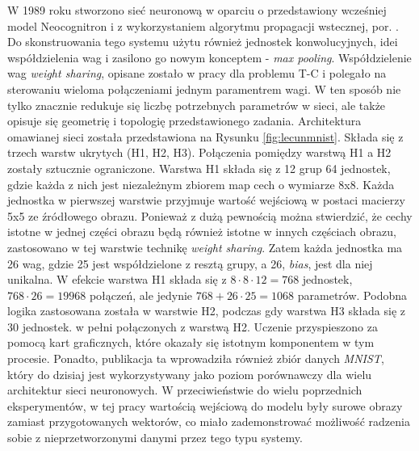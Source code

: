 \documentclass[12pt,a4paper,twoside]{article}
\begin{document}
W 1989 roku stworzono sieć neuronową w oparciu o przedstawiony wcześniej model Neocognitron \citet{fukushima1980} i z wykorzystaniem algorytmu propagacji wstecznej, por. \citet{lecun1989b}. Do skonstruowania tego systemu użytu również jednostek konwolucyjnych, idei współdzielenia wag i zasilono go nowym konceptem - \textit{max pooling}. Współdzielenie wag \textit{weight sharing}, opisane zostało w pracy \citet{rumelhart1986} dla problemu T-C i polegało na sterowaniu wieloma połączeniami jednym paramentrem wagi. W ten sposób nie tylko znacznie redukuje się liczbę potrzebnych parametrów w sieci, ale także opisuje się geometrię i topologię przedstawionego zadania. Architektura omawianej sieci została przedstawiona na Rysunku \ref{fig:lecunmnist}. Składa się z trzech warstw ukrytych (H1, H2, H3). Połączenia pomiędzy warstwą H1 a H2 zostały sztucznie ograniczone. Warstwa H1 składa się z 12 grup 64 jednostek, gdzie każda z nich jest niezależnym zbiorem map cech o wymiarze 8x8. Każda jednostka w pierwszej warstwie przyjmuje wartość wejściową w postaci macierzy 5x5 ze źródłowego obrazu. Ponieważ z dużą pewnością można stwierdzić, że cechy istotne w jednej części obrazu będą również istotne w innych częściach obrazu, zastosowano w tej warstwie technikę \textit{weight sharing}. Zatem każda jednostka ma 26 wag, gdzie 25 jest współdzielone z resztą grupy, a 26, \textit{bias}, jest dla niej unikalna. W efekcie warstwa H1 składa się z $8\cdot8\cdot12=768$ jednostek, $768\cdot26=19968$ połączeń, ale jedynie $768+26\cdot25=1068$  parametrów. Podobna logika zastosowana została w warstwie H2, podczas gdy warstwa H3 składa się z 30 jednostek. w pełni połączonych z warstwą H2. Uczenie przyspieszono za pomocą kart graficznych, które okazały się istotnym komponentem w tym procesie. Ponadto, publikacja ta wprowadziła również zbiór danych \textit{MNIST}, który do dzisiaj jest wykorzystywany jako poziom porównawczy dla wielu architektur sieci neuronowych. W przeciwieństwie do wielu poprzednich eksperymentów, w tej pracy wartością wejściową do modelu były surowe obrazy zamiast przygotowanych wektorów, co miało zademonstrować możliwość radzenia sobie z nieprzetworzonymi danymi przez tego typu systemy.
\end{document}
